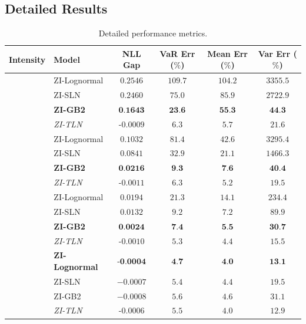 \documentclass[sigconf, anonymous, review]{acmart}
\begin{document}
\subsection{Detailed Results}

\begin{table}[htp]
\centering
\caption{Detailed performance metrics.}
\label{tab:surrogate}
\begin{tabular}{clcccc}
\toprule
\textbf{Intensity} & \textbf{Model} & \textbf{NLL Gap} & \textbf{VaR Err ($\%$)} & \textbf{Mean Err ($\%$)} & \textbf{Var Err ($\%$)} \\
\midrule
{} 
& ZI-Lognormal & $0.2546$ & $109.7$ & $104.2$ & $3355.5$ \\
& ZI-SLN & $0.2460$ & $75.0$ & $85.9$ & $2722.9$ \\
& \textbf{ZI-GB2} & $\textbf{0.1643}$ & $\textbf{23.6}$ & $\textbf{55.3}$ & $\textbf{44.3}$ \\
& \textit{ZI-TLN} & $\textit{-0.0009}$ & $\textit{6.3}$ & $\textit{5.7}$ & $\textit{21.6}$ \\
\midrule
{} 
& ZI-Lognormal & $0.1032$ & $81.4$ & $42.6$ & $3295.4$ \\
& ZI-SLN & $0.0841$ & $32.9$ & $21.1$ & $1466.3$ \\
& \textbf{ZI-GB2} & $\textbf{0.0216}$ & $\textbf{9.3}$ & $\textbf{7.6}$ & $\textbf{40.4}$ \\
& \textit{ZI-TLN} & $\textit{-0.0011}$ & $\textit{6.3}$ & $\textit{5.2}$ & $\textit{19.5}$ \\
\midrule
{} 
& ZI-Lognormal & $0.0194$ & $21.3$ & $14.1$ & $234.4$\\
& ZI-SLN & $0.0132$ & $9.2$ & $7.2$ & $89.9$\\
& \textbf{ZI-GB2} & $\textbf{0.0024}$ & $\textbf{7.4}$ & $\textbf{5.5}$ & $\textbf{30.7}$\\
& \textit{ZI-TLN} & $\textit{-0.0010}$ & $\textit{5.3}$ & $\textit{4.4}$ & $\textit{15.5}$ \\
\midrule
{} 
& \textbf{ZI-Lognormal} & $\textbf{-0.0004}$ & $\textbf{4.7}$ & $\textbf{4.0}$ & $\textbf{13.1}$\\
& ZI-SLN & $-0.0007$ & $5.4$ & $4.4$ & $19.5$ \\
& ZI-GB2 & $-0.0008$ & $5.6$ & $4.6$ & $31.1$\\
& \textit{ZI-TLN} & $\textit{-0.0006}$ & $\textit{5.5}$ & $\textit{4.0}$ & $\textit{12.9}$\\
\bottomrule
\end{tabular}
\end{table}
\end{document}
